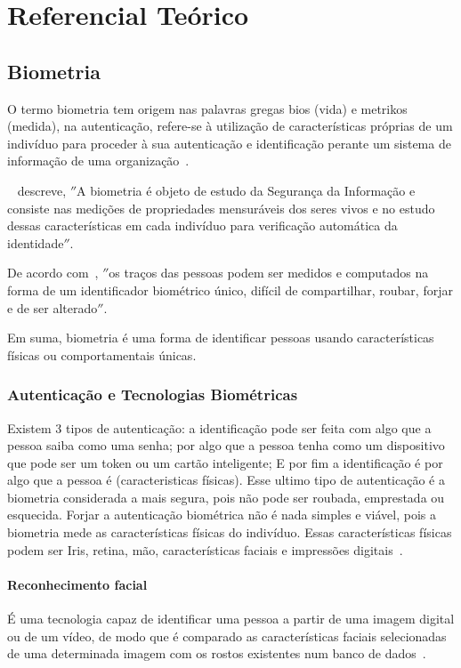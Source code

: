 

\chapter{Referencial Teórico}\label{ch:referencial_teorico}


\section{Biometria}\label{sec:biometria}
O termo biometria tem origem nas palavras gregas bios (vida) e metrikos (medida), na autenticação, refere-se à utilização de características próprias de um indivíduo para proceder à sua autenticação e identificação perante um sistema de informação de uma organização~\cite{magalhaes2003biometria}.

~ descreve, \(''\)A biometria é objeto de estudo da Segurança da Informação e consiste nas medições de propriedades mensuráveis dos seres vivos e no estudo dessas características em cada indivíduo para verificação automática da identidade\(''\).

De acordo com~, \(''\)os traços das pessoas podem ser medidos e computados na forma de um identificador biométrico único, difícil de compartilhar, roubar, forjar e de ser alterado\(''\).

Em suma, biometria é uma forma de identificar pessoas usando características físicas ou comportamentais únicas.

\subsection{Autenticação e Tecnologias Biométricas}\label{subsec:biometria-tecnologias}
Existem 3 tipos de autenticação: a identificação pode ser feita com algo que a pessoa saiba como uma senha; por algo que a pessoa tenha como um dispositivo que pode ser um token ou um cartão inteligente; E por fim a identificação é por algo que a pessoa é (caracteristicas físicas).
Esse ultimo tipo de autenticação é a biometria considerada a mais segura, pois não pode ser roubada, emprestada ou esquecida.
Forjar a autenticação biométrica não é nada simples e viável, pois a biometria mede as características físicas do indivíduo.
Essas características físicas podem ser Iris, retina, mão, características faciais e impressões digitais~\cite{dos2019tecnologias}.


\subsubsection{Reconhecimento facial}\label{subsec:reconhecimento-facial}
É uma tecnologia capaz de identificar uma pessoa a partir de uma imagem digital ou de um vídeo, de modo que é comparado as características faciais selecionadas de uma determinada imagem com os rostos existentes num banco de dados~\cite{orvalho2019reconhecimento}.


